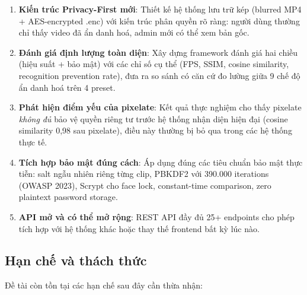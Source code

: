 \begin{enumerate}[1.]
    \item \textbf{Kiến trúc Privacy-First mới}: Thiết kế hệ thống lưu trữ kép (blurred MP4 + AES-encrypted .enc) với kiến trúc phân quyền rõ ràng: người dùng thường chỉ thấy video đã ẩn danh hoá, admin mới có thể xem bản gốc.
    
    \item \textbf{Đánh giá định lượng toàn diện}: Xây dựng framework đánh giá hai chiều (hiệu suất + bảo mật) với các chỉ số cụ thể (FPS, SSIM, cosine similarity, recognition prevention rate), đưa ra so sánh có căn cứ đo lường giữa 9 chế độ ẩn danh hoá trên 4 preset.
    
    \item \textbf{Phát hiện điểm yếu của pixelate}: Kết quả thực nghiệm cho thấy pixelate \textit{không đủ} bảo vệ quyền riêng tư trước hệ thống nhận diện hiện đại (cosine similarity 0,98 sau pixelate), điều này thường bị bỏ qua trong các hệ thống thực tế.
    
    \item \textbf{Tích hợp bảo mật đúng cách}: Áp dụng đúng các tiêu chuẩn bảo mật thực tiễn: salt ngẫu nhiên riêng từng clip, PBKDF2 với 390.000 iterations (OWASP 2023), Scrypt cho face lock, constant-time comparison, zero plaintext password storage.
    
    \item \textbf{API mở và có thể mở rộng}: REST API đầy đủ 25+ endpoints cho phép tích hợp với hệ thống khác hoặc thay thế frontend bất kỳ lúc nào.
\end{enumerate}

\subsection{Hạn chế và thách thức}
\label{subsec:hanche}

Đề tài còn tồn tại các hạn chế sau đây cần thừa nhận:

